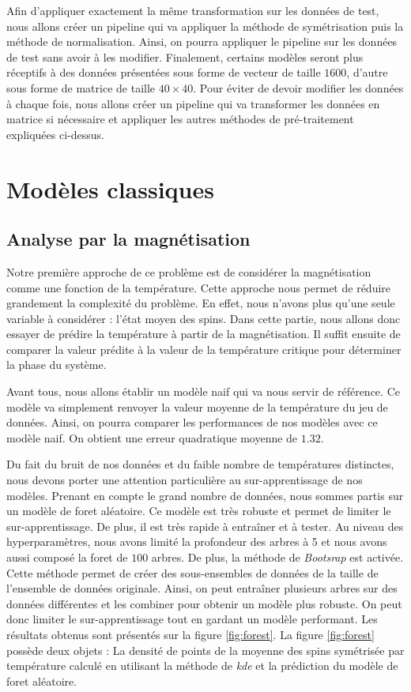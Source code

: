 \documentclass[11pt, parskip=half]{scrartcl} %
\begin{document}
Afin d'appliquer exactement la même transformation sur les données de test, nous allons créer un pipeline qui va appliquer la méthode de symétrisation puis la méthode de normalisation. Ainsi, on pourra appliquer le pipeline sur les données de test sans avoir à les modifier.
Finalement, certains modèles seront plus réceptifs à des données présentées sous forme de vecteur de taille $1600$, d'autre sous forme de matrice de taille $40 \times 40$. Pour éviter de devoir modifier les données à chaque fois, nous allons créer un pipeline qui va transformer les données en matrice si nécessaire et appliquer les autres méthodes de pré-traitement expliquées ci-dessus.

\section{Modèles classiques}

\subsection{Analyse par la magnétisation}
Notre première approche de ce problème est de considérer la magnétisation comme une fonction de la température. Cette approche nous permet de réduire grandement la complexité du problème. En effet, nous n'avons plus qu'une seule variable à considérer : l'état moyen des spins. Dans cette partie, nous allons donc essayer de prédire la température à partir de la magnétisation. Il suffit ensuite de comparer la valeur prédite à la valeur de la température critique pour déterminer la phase du système.

Avant tous, nous allons établir un modèle naif qui va nous servir de référence. Ce modèle va simplement renvoyer la valeur moyenne de la température du jeu de données. Ainsi, on pourra comparer les performances de nos modèles avec ce modèle naif. On obtient une erreur quadratique moyenne de $1.32$.

Du fait du bruit de nos données et du faible nombre de températures distinctes, nous devons porter une attention particulière au sur-apprentissage de nos modèles.
Prenant en compte le grand nombre de données, nous sommes partis sur un modèle de foret aléatoire. Ce modèle est très robuste et permet de limiter le sur-apprentissage. De plus, il est très rapide à entraîner et à tester. 
Au niveau des hyperparamètres, nous avons limité la profondeur des arbres à 5 et nous avons aussi composé la foret de $100$ arbres. De plus, la méthode de \textit{Bootsrap} est activée. Cette méthode permet de créer des sous-ensembles de données de la taille de l'ensemble de données originale. Ainsi, on peut entraîner plusieurs arbres sur des données différentes et les combiner pour obtenir un modèle plus robuste.
On peut donc limiter le sur-apprentissage tout en gardant un modèle performant. Les résultats obtenus sont présentés sur la figure \ref{fig:forest}.
La figure \ref{fig:forest} possède deux objets : La densité de points de la moyenne des spins symétrisée par température calculé en utilisant la méthode de \textit{kde} et la prédiction du modèle de foret aléatoire. 
\end{document}
